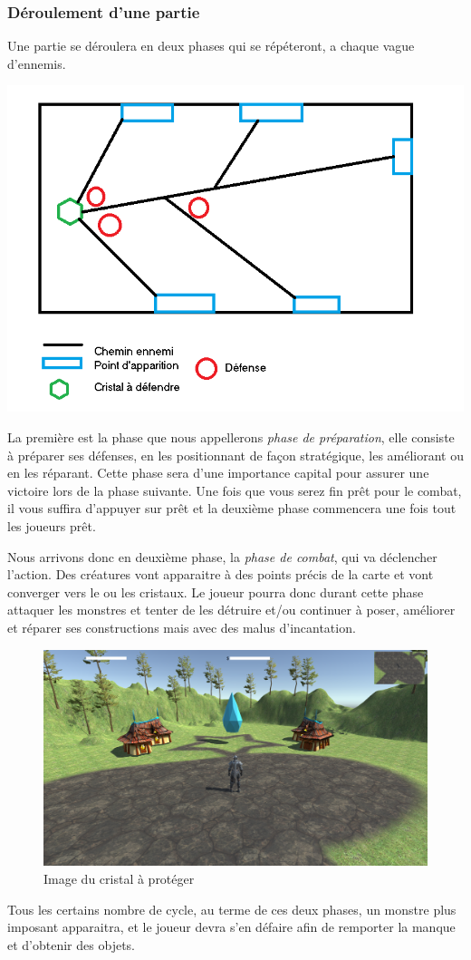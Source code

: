 \documentclass[a4paper, 12pt]{article}
\begin{document}
		\subsubsection{Déroulement d'une partie}
		Une partie se déroulera en deux phases qui se répéteront, a chaque vague d'ennemis.\\
		\centerline{\includegraphics[scale=0.55]{Plan.png}}
		\par La première est la phase que nous appellerons \textit{phase de préparation}, elle consiste à préparer ses défenses, en les positionnant de façon stratégique, les améliorant ou en les réparant. Cette phase sera d'une importance capital pour assurer une victoire lors de la phase suivante. Une fois que vous serez fin prêt pour le combat, il vous suffira d'appuyer sur prêt et la deuxième phase commencera une fois tout les joueurs prêt.
		\par Nous arrivons donc en deuxième phase, la \textit{phase de combat}, qui va déclencher l'action. Des créatures vont apparaitre à des points précis de la carte et vont converger vers le ou les cristaux. Le joueur pourra donc durant cette phase attaquer les monstres et tenter de les détruire et/ou continuer à poser, améliorer et réparer ses constructions mais avec des malus d'incantation.
		\bigbreak
		\begin{figure}[!ht]
			\centerline{\includegraphics[scale=0.3]{cristalprojet.png}}
			\caption*{Image du cristal à protéger}
		\end{figure}
		\par Tous les certains nombre de cycle, au terme de ces deux phases, un monstre plus imposant apparaitra, et le joueur devra s'en défaire afin de remporter la manque et d'obtenir des objets.
\end{document}
